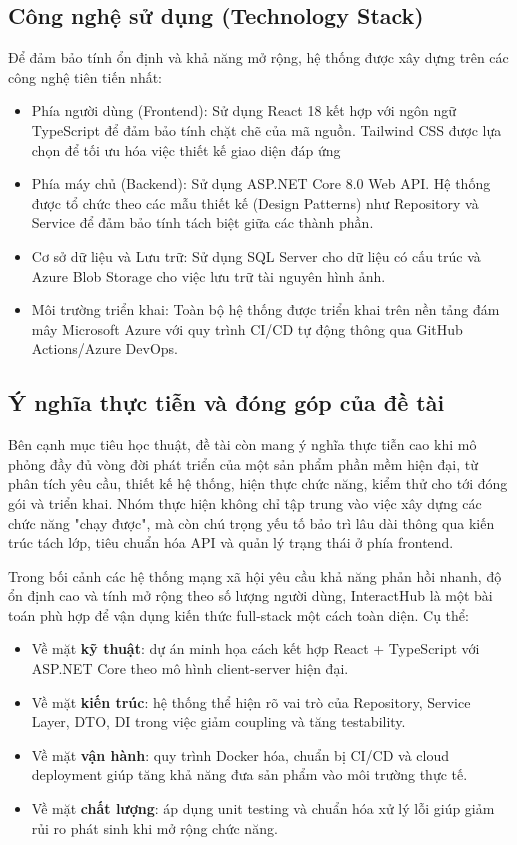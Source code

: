 \documentclass[a4paper]{article}
\begin{document}
    \subsection{Công nghệ sử dụng (Technology Stack)}
    Để đảm bảo tính ổn định và khả năng mở rộng, hệ thống được xây dựng trên các công nghệ tiên tiến nhất:
        \begin{itemize}
            \item Phía người dùng (Frontend): Sử dụng React 18 kết hợp với ngôn ngữ TypeScript để đảm bảo tính chặt chẽ của mã nguồn. Tailwind CSS được lựa chọn để tối ưu hóa việc thiết kế giao diện đáp ứng
            \item Phía máy chủ (Backend): Sử dụng ASP.NET Core 8.0 Web API. Hệ thống được tổ chức theo các mẫu thiết kế (Design Patterns) như Repository và Service để đảm bảo tính tách biệt giữa các thành phần.
            \item Cơ sở dữ liệu và Lưu trữ: Sử dụng SQL Server cho dữ liệu có cấu trúc và Azure Blob Storage cho việc lưu trữ tài nguyên hình ảnh.
            \item Môi trường triển khai: Toàn bộ hệ thống được triển khai trên nền tảng đám mây Microsoft Azure với quy trình CI/CD tự động thông qua GitHub Actions/Azure DevOps.
        \end{itemize}


    \subsection{Ý nghĩa thực tiễn và đóng góp của đề tài}
    Bên cạnh mục tiêu học thuật, đề tài còn mang ý nghĩa thực tiễn cao khi mô phỏng đầy đủ vòng đời phát triển của một sản phẩm phần mềm hiện đại, từ phân tích yêu cầu, thiết kế hệ thống, hiện thực chức năng, kiểm thử cho tới đóng gói và triển khai. Nhóm thực hiện không chỉ tập trung vào việc xây dựng các chức năng "chạy được", mà còn chú trọng yếu tố bảo trì lâu dài thông qua kiến trúc tách lớp, tiêu chuẩn hóa API và quản lý trạng thái ở phía frontend.

    Trong bối cảnh các hệ thống mạng xã hội yêu cầu khả năng phản hồi nhanh, độ ổn định cao và tính mở rộng theo số lượng người dùng, InteractHub là một bài toán phù hợp để vận dụng kiến thức full-stack một cách toàn diện. Cụ thể:
    \begin{itemize}
        \item Về mặt \textbf{kỹ thuật}: dự án minh họa cách kết hợp React + TypeScript với ASP.NET Core theo mô hình client-server hiện đại.
        \item Về mặt \textbf{kiến trúc}: hệ thống thể hiện rõ vai trò của Repository, Service Layer, DTO, DI trong việc giảm coupling và tăng testability.
        \item Về mặt \textbf{vận hành}: quy trình Docker hóa, chuẩn bị CI/CD và cloud deployment giúp tăng khả năng đưa sản phẩm vào môi trường thực tế.
        \item Về mặt \textbf{chất lượng}: áp dụng unit testing và chuẩn hóa xử lý lỗi giúp giảm rủi ro phát sinh khi mở rộng chức năng.
    \end{itemize}
\end{document}

